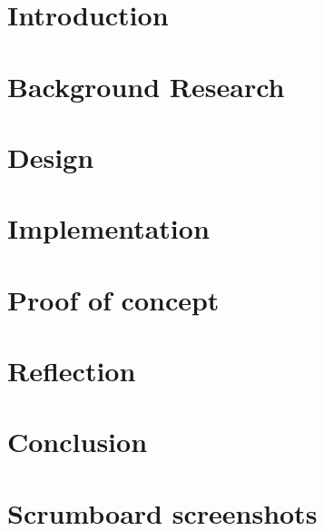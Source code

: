 \documentclass[]{report}
\begin{document}
\graphicspath{{img/}{../img/}}


\setcounter{tocdepth}{1}

\tableofcontents

\chapter{Introduction}


\chapter{Background Research}


\chapter{Design}


\chapter{Implementation}


\chapter{Proof of concept}


\chapter{Reflection}


\chapter{Conclusion}




\appendix

\chapter{Scrumboard screenshots}



\end{document}
